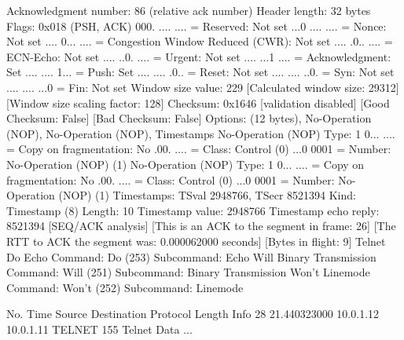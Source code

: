     Acknowledgment number: 86    (relative ack number)
    Header length: 32 bytes
    Flags: 0x018 (PSH, ACK)
        000. .... .... = Reserved: Not set
        ...0 .... .... = Nonce: Not set
        .... 0... .... = Congestion Window Reduced (CWR): Not set
        .... .0.. .... = ECN-Echo: Not set
        .... ..0. .... = Urgent: Not set
        .... ...1 .... = Acknowledgment: Set
        .... .... 1... = Push: Set
        .... .... .0.. = Reset: Not set
        .... .... ..0. = Syn: Not set
        .... .... ...0 = Fin: Not set
    Window size value: 229
    [Calculated window size: 29312]
    [Window size scaling factor: 128]
    Checksum: 0x1646 [validation disabled]
        [Good Checksum: False]
        [Bad Checksum: False]
    Options: (12 bytes), No-Operation (NOP), No-Operation (NOP), Timestamps
        No-Operation (NOP)
            Type: 1
                0... .... = Copy on fragmentation: No
                .00. .... = Class: Control (0)
                ...0 0001 = Number: No-Operation (NOP) (1)
        No-Operation (NOP)
            Type: 1
                0... .... = Copy on fragmentation: No
                .00. .... = Class: Control (0)
                ...0 0001 = Number: No-Operation (NOP) (1)
        Timestamps: TSval 2948766, TSecr 8521394
            Kind: Timestamp (8)
            Length: 10
            Timestamp value: 2948766
            Timestamp echo reply: 8521394
    [SEQ/ACK analysis]
        [This is an ACK to the segment in frame: 26]
        [The RTT to ACK the segment was: 0.000062000 seconds]
        [Bytes in flight: 9]
Telnet
    Do Echo
        Command: Do (253)
        Subcommand: Echo
    Will Binary Transmission
        Command: Will (251)
        Subcommand: Binary Transmission
    Won't Linemode
        Command: Won't (252)
        Subcommand: Linemode

No.     Time           Source                Destination           Protocol Length Info
     28 21.440323000   10.0.1.12             10.0.1.11             TELNET   155    Telnet Data ...

